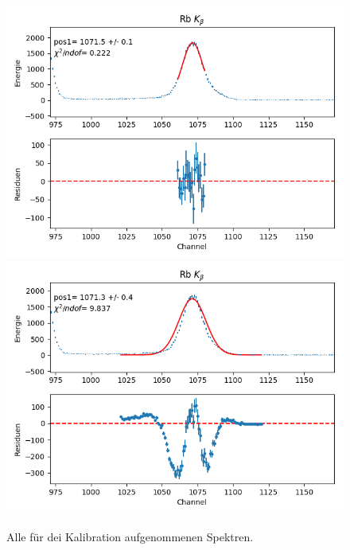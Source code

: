 \documentclass[12pt,a4paper]{article}
\begin{document}
\begin{figure}[H]
\centering
\includegraphics[scale=0.8]{Bilder/alpha/rb_beta_1.png}
\includegraphics[scale=0.8]{Bilder/alpha/rb_beta_2.png}
\caption{Alle für dei Kalibration aufgenommenen Spektren.}
\label{fig:kal_alles}
\end{figure}
\end{document}
